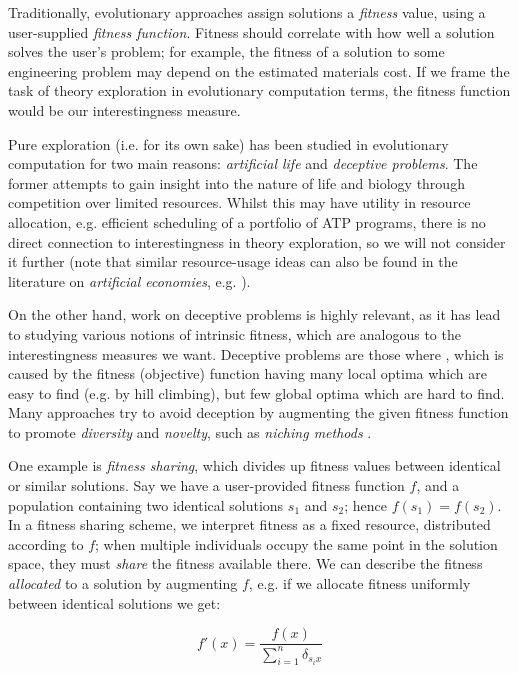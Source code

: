 \documentclass[]{article}
\begin{document}
Traditionally, evolutionary approaches assign solutions a \emph{fitness} value, using a user-supplied \emph{fitness function}. Fitness should correlate with how well a solution solves the user's problem; for example, the fitness of a solution to some engineering problem may depend on the estimated materials cost. If we frame the task of theory exploration in evolutionary computation terms, the fitness function would be our interestingness measure.

Pure exploration (i.e. for its own sake) has been studied in evolutionary computation for two main reasons: \emph{artificial life} and \emph{deceptive problems}. The former attempts to gain insight into the nature of life and biology through competition over limited resources. Whilst this may have utility in resource allocation, e.g. efficient scheduling of a portfolio of ATP programs, there is no direct connection to interestingness in theory exploration, so we will not consider it further (note that similar resource-usage ideas can also be found in the literature on \emph{artificial economies}, e.g. \cite{baum2000evolution}).

On the other hand, work on deceptive problems is highly relevant, as it has lead to studying various notions of intrinsic fitness, which are analogous to the interestingness measures we want. Deceptive problems are those where  \cite{lehman2011abandoning}, which is caused by the fitness (objective) function having many local optima which are easy to find (e.g. by hill climbing), but few global optima which are hard to find. Many approaches try to avoid deception by augmenting the given fitness function to promote \emph{diversity} and \emph{novelty}, such as \emph{niching methods} \cite{sareni1998fitness}.

One example is \emph{fitness sharing}, which divides up fitness values between identical or similar solutions. Say we have a user-provided fitness function $f$, and a population containing two identical solutions $s_1$ and $s_2$; hence $f(s_1) = f(s_2)$. In a fitness sharing scheme, we interpret fitness as a fixed resource, distributed according to $f$; when multiple individuals occupy the same point in the solution space, they must \emph{share} the fitness available there. We can describe the fitness \emph{allocated} to a solution by augmenting $f$, e.g. if we allocate fitness uniformly between identical solutions we get:

$$f'(x) = \frac{f(x)}{\sum_{i=1}^n \delta_{s_i x}}$$
\end{document}
